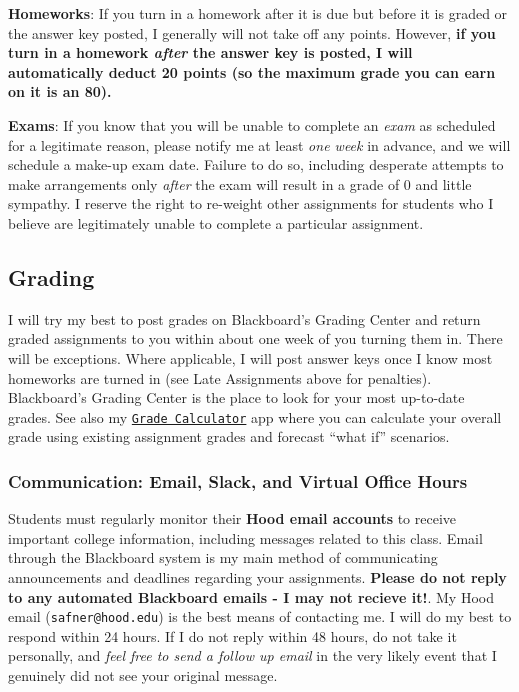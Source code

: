 \documentclass{article}
\begin{document}
\textbf{Homeworks}: If you turn in a homework after it is due but before
it is graded or the answer key posted, I generally will not take off any
points. However, \textbf{if you turn in a homework \emph{after} the
answer key is posted, I will automatically deduct 20 points (so the
maximum grade you can earn on it is an 80).}

\textbf{Exams}: If you know that you will be unable to complete an
\emph{exam} as scheduled for a legitimate reason, please notify me at
least \emph{one week} in advance, and we will schedule a make-up exam
date. Failure to do so, including desperate attempts to make
arrangements only \emph{after} the exam will result in a grade of 0 and
little sympathy. I reserve the right to re-weight other assignments for
students who I believe are legitimately unable to complete a particular
assignment.

\hypertarget{grading}{%
\subsection*{Grading}\label{grading}}

I will try my best to post grades on Blackboard's Grading Center and
return graded assignments to you within about one week of you turning
them in. There will be exceptions. Where applicable, I will post answer
keys once I know most homeworks are turned in (see Late Assignments
above for penalties). Blackboard's Grading Center is the place to look
for your most up-to-date grades. See also my
\href{https://ryansafner.shinyapps.io/law_grade_calculator/}{
\texttt{Grade\ Calculator}} app where you can calculate your overall
grade using existing assignment grades and forecast ``what if''
scenarios.

\hypertarget{communication-email-slack-and-virtual-office-hours}{%
\subsubsection*{Communication: Email, Slack, and Virtual Office
Hours}\label{communication-email-slack-and-virtual-office-hours}}

Students must regularly monitor their \textbf{Hood email accounts} to
receive important college information, including messages related to
this class. Email through the Blackboard system is my main method of
communicating announcements and deadlines regarding your assignments.
\textbf{Please do not reply to any automated Blackboard emails - I may
not recieve it!}. My Hood email (\texttt{safner@hood.edu}) is the best
means of contacting me. I will do my best to respond within 24 hours. If
I do not reply within 48 hours, do not take it personally, and
\emph{feel free to send a follow up email} in the very likely event that
I genuinely did not see your original message.
\end{document}
